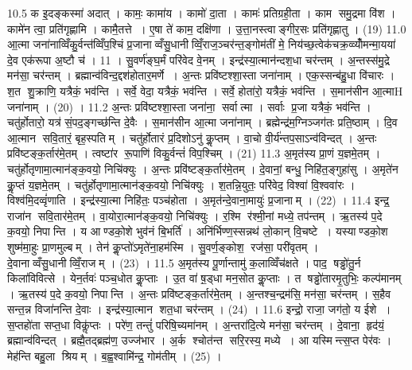 10.5
क इ॒दङ्कस्मा॑ अदात् । कामः॒ कामा॑य । कामो॑ दा॒ता । कामः॑ प्रतिग्रही॒ता । काम समु॒द्रमा वि॑श । कामे॑न त्वा॒ प्रति॑गृह्णामि । कामै॒तत्ते । ए॒षा ते॑ काम॒ दक्षि॑णा । उ॒त्ता॒नस्त्वाङ्गीर॒सः प्रति॑गृह्णातु । (19)
11.0
आ॒त्मा जना॑नाव्विँकु॒र्वन्त॑व्विँप॒श्चिं प्र॒जानाव्वँसु॒धानीव्विँ॒राज॒ञ्चर॑न्त॒ङ्गोम॑तीं मे॒ निय॑च्छ॒त्वेक॑चक्र॒व्व्योँ॑मन्मा॒यया॑ दे॒व एक॑रूपा अ॒ष्टौ च॑ । 11 ।
सु॒वर्ण॑ङ्घ॒र्मं परि॑वेद वे॒नम् । इन्द्र॑स्या॒त्मान॑न्दश॒धा चर॑न्तम् । अ॒न्तस्स॑मु॒द्रे मन॑सा॒ चर॑न्तम् । ब्रह्मान्व॑विन्द॒द्दश॑होतार॒मर्णे । अ॒न्तः प्रवि॑ष्टश्शा॒स्ता जना॑नाम् । एक॒स्सन्ब॑हु॒धा वि॑चारः । श॒त शु॒क्राणि॒ यत्रैकं॒ भव॑न्ति । सर्वे॒ वेदा॒ यत्रैकं॒ भव॑न्ति । सर्वे॒ होता॑रो॒ यत्रैकं॒ भव॑न्ति । स॒मान॑सीन आ॒त्माH जना॑नाम् । (20) ।
11.2
अ॒न्तः प्रवि॑ष्टश्शा॒स्ता जना॑ना॒ सर्वात्मा । सर्वाः प्र॒जा यत्रैकं॒ भव॑न्ति । चतु॑र्\mbox{}होतारो॒ यत्र॑ सं॒पद॒ङ्गच्छ॑न्ति दे॒वैः । स॒मान॑सीन आ॒त्मा जना॑नाम् । ब्रह्मेन्द्र॑म॒ग्निञ्जग॑तः प्रति॒ष्ठाम् । दि॒व आ॒त्मान सवि॒तारं॒ बृह॒स्पतिम् । चतु॑र्\mbox{}होतारं प्र॒दिशोऽनु॑ कॢ॒प्तम् । वा॒चो वी॒र्य॑न्तप॒साऽन्व॑विन्दत् । अ॒न्तः प्रवि॑ष्टङ्क॒र्तार॑मे॒तम् । त्वष्टा॑र रू॒पाणि॑ विकु॒र्वन्तं॑ विप॒श्चिम् । (21)
11.3
अ॒मृत॑स्य प्रा॒णं य॒ज्ञमे॒तम् । चतु॑र्\mbox{}होतृणामा॒त्मान॑ङ्क॒वयो॒ निचि॑क्युः । अ॒न्तः प्रवि॑ष्टङ्क॒र्तार॑मे॒तम् । दे॒वानां॒ बन्धु॒ निहि॑त॒ङ्गुहा॑सु । अ॒मृते॑न कॢ॒प्तं य॒ज्ञमे॒तम् । चतु॑र्\mbox{}होतृणामा॒त्मान॑ङ्क॒वयो॒ निचि॑क्युः । श॒तन्नि॒युतः॒ परि॑वेद॒ विश्वा॑ वि॒श्ववा॑रः । विश्व॑मि॒दव्वृं॑णाति । इन्द्र॑स्या॒त्मा निहि॑तः॒ पञ्च॑होता । अ॒मृत॑न्दे॒वाना॒मायुः॑ प्र॒जानाम् । (22) ।
11.4
इन्द्र॒ राजा॑न सवि॒तार॑मे॒तम् । वा॒योरा॒त्मान॑ङ्क॒वयो॒ निचि॑क्युः । र॒श्मि र॑श्मी॒नां मध्ये॒ तप॑न्तम् । ऋ॒तस्य॑ प॒दे क॒वयो॒ निपान्ति । य आण्डको॒शे भुव॑नं बि॒भर्ति॑ । अनि॑र्भिण्ण॒स्सन्नथ॑ लो॒कान् वि॒चष्टे । यस्याण्डको॒श शुष्म॑मा॒हुः प्रा॒णमुल्बम् । तेन॑ कॢ॒प्तो॑ऽमृते॑ना॒हम॑स्मि । सु॒वर्ण॒ङ्कोश॒ रज॑सा॒ परी॑वृतम् । दे॒वानाव्वँसु॒धानीव्विँ॒राजम् । (23) ।
11.5
अ॒मृत॑स्य पू॒र्णान्तामु॑ क॒लाव्विँच॑क्षते । पाद॒ षड्ढो॑तु॒र्न किला॑विवित्से । येन॒र्तवः॑ पञ्च॒धोत कॢ॒प्ताः । उ॒त वा॑ ष़॒ड्धा मन॒सोत कॢ॒प्ताः । त षड्ढो॑तारमृ॒तुभिः॒ कल्प॑मानम् । ऋ॒तस्य॑ प॒दे क॒वयो॒ निपान्ति । अ॒न्तः प्रवि॑ष्टङ्क॒र्तार॑मे॒तम् । अ॒न्तश्च॒न्द्रम॑सि॒ मन॑सा॒ चर॑न्तम् । स॒हैव सन्त॒न्न विजा॑नन्ति दे॒वाः । इन्द्र॑स्या॒त्मान शत॒धा चर॑न्तम् । (24) ।
11.6
इन्द्रो॒ राजा॒ जग॑तो॒ य ईशे । स॒प्तहो॑ता सप्त॒धा विकॢ॑प्तः । परे॑ण॒ तन्तुं॑ परिषि॒च्यमा॑नम् । अ॒न्तरा॑दि॒त्ये मन॑सा॒ चर॑न्तम् । दे॒वाना॒ हृद॑यं॒ ब्रह्मान्व॑विन्दत् । ब्रह्मै॒तद्ब्रह्म॑ण॒ उज्ज॑भार । अ॒र्क श्चोत॑न्त सरि॒रस्य॒ मध्ये । आ यस्मिन्त्स॒प्त पेर॑वः । मेह॑न्ति बहु॒ला श्रियम् । ब॒ह्व॒श्वामि॑न्द्र॒ गोम॑तीम् । (25) ।
